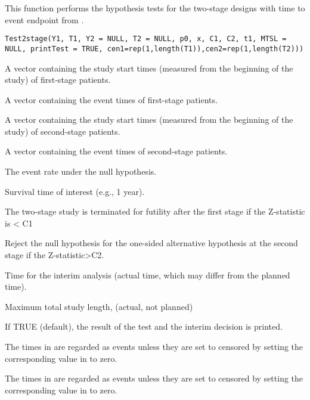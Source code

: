 \begin{Description}\relax
This function performs the hypothesis tests for the two-stage designs
with time to event endpoint from .
\end{Description}
\begin{Usage}
\begin{verbatim}
Test2stage(Y1, T1, Y2 = NULL, T2 = NULL, p0, x, C1, C2, t1, MTSL =
NULL, printTest = TRUE, cen1=rep(1,length(T1)),cen2=rep(1,length(T2)))
\end{verbatim}
\end{Usage}
\begin{Arguments}
\begin{ldescription}
\item[\code{Y1}] A vector containing the study start times (measured from
the beginning of the study) of first-stage patients.
\item[\code{T1}] A vector containing the event times of first-stage patients.
\item[\code{Y2}] A vector containing the study start times (measured from
the beginning of the study) of second-stage patients.
\item[\code{T2}] A vector containing the event times of second-stage
patients.
\item[\code{p0}] The event rate under the null hypothesis.
\item[\code{x}] Survival time of interest (e.g., 1 year).
\item[\code{C1}] The two-stage study is terminated for futility after the
first stage if the Z-statistic is < C1
\item[\code{C2}] Reject the null hypothesis for the one-sided alternative
hypothesis at the second stage if the Z-statistic>C2.
\item[\code{t1}] Time for the interim analysis (actual time, which may
differ from the planned time).
\item[\code{MTSL}] Maximum total study length, (actual, not planned)
\item[\code{printTest}] If TRUE (default), the result of the test and the
interim decision is printed.
\item[\code{cen1}] The times in  are regarded as events unless
they are set to censored by setting the corresponding value in
 to zero.
\item[\code{cen2}] The times in  are regarded as events unless
they are set to censored by setting the corresponding value in
 to zero.
\end{ldescription}
\end{Arguments}

